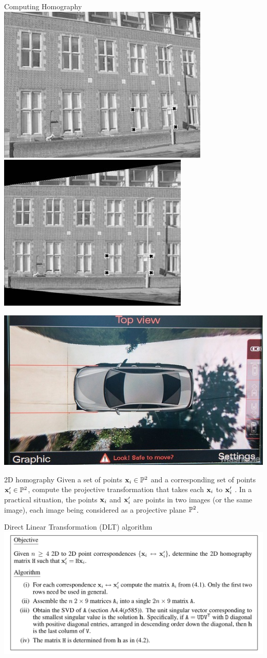 \documentclass[times,t]{beamer}
\begin{document}
\begin{frame}{Computing Homography}
  \includegraphics[width=0.45\linewidth]{media/removing-perspective-distortion.png}
  \includegraphics[width=0.45\linewidth]{media/removing-perspective-distortion-b.png}
\end{frame}
\begin{frame}
  \includegraphics[width=0.60\linewidth]{media/audi top view camera.jpg}
\end{frame}

\begin{frame}{2D homography}
Given a set of points $\mathbf{x}_i \in \mathbb{P}^2$ and a corresponding set of
points $\mathbf{x}'_i \in \mathbb{P}^2$, compute the projective transformation that takes each
$\mathbf{x}_i$ to $\mathbf{x}'_i$ . In a practical situation, the points $\mathbf{x}_i$ and   $\mathbf{x}'_i$  are points in two images
(or the same image), each image being considered as a projective plane  $\mathbb{P}^2$.
\end{frame}

\begin{frame}{Direct Linear Transformation   (DLT) algorithm}
  \includegraphics[width=\linewidth]{media/DLT-algorithm.png}
\end{frame}
\end{document}
